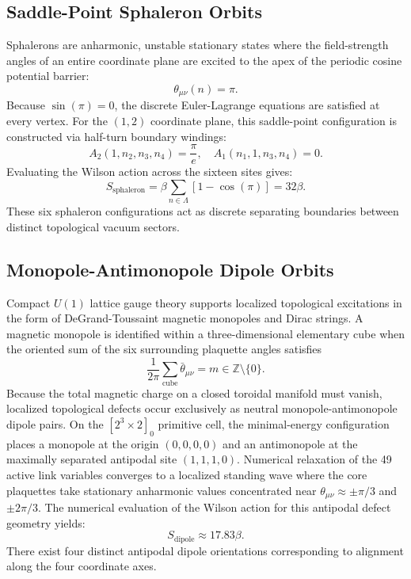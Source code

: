 \documentclass[11pt,a4paper]{article}
\begin{document}
\subsection{Saddle-Point Sphaleron Orbits}
Sphalerons are anharmonic, unstable stationary states where the field-strength angles of an entire coordinate plane are excited to the apex of the periodic cosine potential barrier:
\begin{equation}
\theta_{\mu\nu}(n) = \pi.
\end{equation}
Because $\sin(\pi) = 0$, the discrete Euler-Lagrange equations are satisfied at every vertex. For the $(1,2)$ coordinate plane, this saddle-point configuration is constructed via half-turn boundary windings:
\begin{equation}
A_2(1, n_2, n_3, n_4) = \frac{\pi}{e}, \quad A_1(n_1, 1, n_3, n_4) = 0.
\end{equation}
Evaluating the Wilson action across the sixteen sites gives:
\begin{equation}
S_{\text{sphaleron}} = \beta \sum_{n \in \Lambda} \left[ 1 - \cos(\pi) \right] = 32\beta.
\end{equation}
These six sphaleron configurations act as discrete separating boundaries between distinct topological vacuum sectors.

\subsection{Monopole-Antimonopole Dipole Orbits}
Compact $U(1)$ lattice gauge theory supports localized topological excitations in the form of DeGrand-Toussaint magnetic monopoles and Dirac strings. A magnetic monopole is identified within a three-dimensional elementary cube when the oriented sum of the six surrounding plaquette angles satisfies
\begin{equation}
\frac{1}{2\pi} \sum_{\text{cube}} \bar{\theta}_{\mu\nu} = m \in \mathbb{Z} \setminus \{0\}.
\end{equation}
Because the total magnetic charge on a closed toroidal manifold must vanish, localized topological defects occur exclusively as neutral monopole-antimonopole dipole pairs. On the $[2^3 \times 2]_0$ primitive cell, the minimal-energy configuration places a monopole at the origin $(0,0,0,0)$ and an antimonopole at the maximally separated antipodal site $(1,1,1,0)$. Numerical relaxation of the 49 active link variables converges to a localized standing wave where the core plaquettes take stationary anharmonic values concentrated near $\theta_{\mu\nu} \approx \pm \pi/3$ and $\pm 2\pi/3$. The numerical evaluation of the Wilson action for this antipodal defect geometry yields:
\begin{equation}
S_{\text{dipole}} \approx 17.83\beta.
\end{equation}
There exist four distinct antipodal dipole orientations corresponding to alignment along the four coordinate axes.
\end{document}
